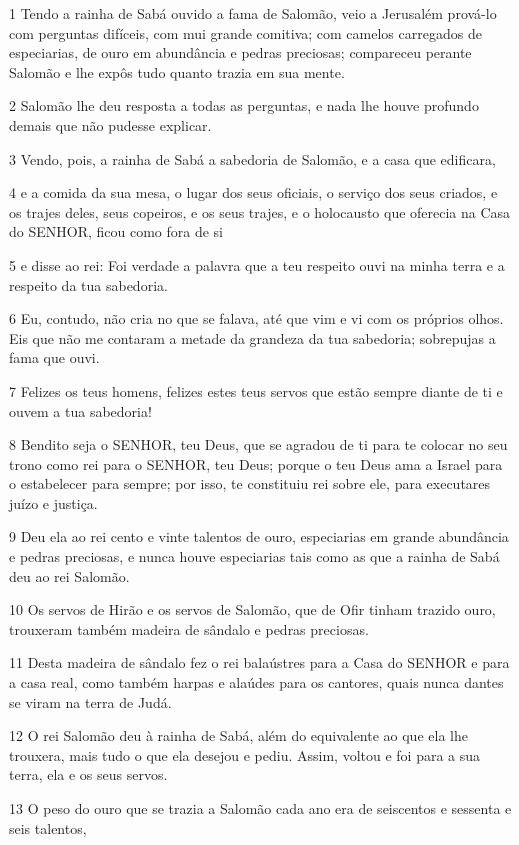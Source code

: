 \par 1 Tendo a rainha de Sabá ouvido a fama de Salomão, veio a Jerusalém prová-lo com perguntas difíceis, com mui grande comitiva; com camelos carregados de especiarias, de ouro em abundância e pedras preciosas; compareceu perante Salomão e lhe expôs tudo quanto trazia em sua mente.
\par 2 Salomão lhe deu resposta a todas as perguntas, e nada lhe houve profundo demais que não pudesse explicar.
\par 3 Vendo, pois, a rainha de Sabá a sabedoria de Salomão, e a casa que edificara,
\par 4 e a comida da sua mesa, o lugar dos seus oficiais, o serviço dos seus criados, e os trajes deles, seus copeiros, e os seus trajes, e o holocausto que oferecia na Casa do SENHOR, ficou como fora de si
\par 5 e disse ao rei: Foi verdade a palavra que a teu respeito ouvi na minha terra e a respeito da tua sabedoria.
\par 6 Eu, contudo, não cria no que se falava, até que vim e vi com os próprios olhos. Eis que não me contaram a metade da grandeza da tua sabedoria; sobrepujas a fama que ouvi.
\par 7 Felizes os teus homens, felizes estes teus servos que estão sempre diante de ti e ouvem a tua sabedoria!
\par 8 Bendito seja o SENHOR, teu Deus, que se agradou de ti para te colocar no seu trono como rei para o SENHOR, teu Deus; porque o teu Deus ama a Israel para o estabelecer para sempre; por isso, te constituiu rei sobre ele, para executares juízo e justiça.
\par 9 Deu ela ao rei cento e vinte talentos de ouro, especiarias em grande abundância e pedras preciosas, e nunca houve especiarias tais como as que a rainha de Sabá deu ao rei Salomão.
\par 10 Os servos de Hirão e os servos de Salomão, que de Ofir tinham trazido ouro, trouxeram também madeira de sândalo e pedras preciosas.
\par 11 Desta madeira de sândalo fez o rei balaústres para a Casa do SENHOR e para a casa real, como também harpas e alaúdes para os cantores, quais nunca dantes se viram na terra de Judá.
\par 12 O rei Salomão deu à rainha de Sabá, além do equivalente ao que ela lhe trouxera, mais tudo o que ela desejou e pediu. Assim, voltou e foi para a sua terra, ela e os seus servos.
\par 13 O peso do ouro que se trazia a Salomão cada ano era de seiscentos e sessenta e seis talentos,
